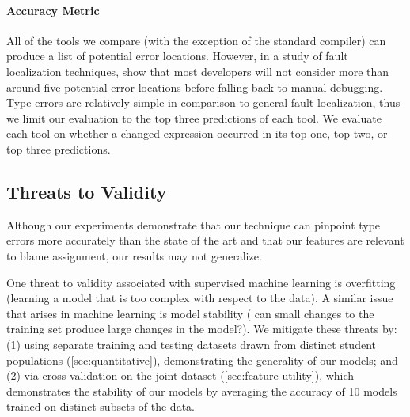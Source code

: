 

\paragraph{Accuracy Metric}
All of the tools we compare (with the exception of the standard \ocaml
compiler) can produce a list of potential error locations. 
%
However, in a study of fault localization techniques,
\citet{Kochhar2016-oc} show that most developers will not consider more
than around five potential error locations before falling back to manual
debugging.
%
Type errors are relatively simple in comparison to general fault
localization, thus we limit our evaluation to the top three predictions
of each tool.
%
We evaluate each tool on whether a changed expression occurred in its
top one, top two, or top three predictions.





\subsection{Threats to Validity} 

Although our experiments demonstrate that our technique can pinpoint type
errors more accurately than the state of the art and that our features are
relevant to blame assignment, our results may not generalize. 

One threat to validity associated with supervised machine learning is
overfitting (\ie learning a model that is too complex with respect to
the data).
%
A similar issue that arises in machine learning is model stability (\ie
can small changes to the training set produce large changes in the model?).
%
We mitigate these threats by:
%
(1) using separate training and testing datasets drawn from distinct
student populations (\autoref{sec:quantitative}), demonstrating the
generality of our models; and
%
(2) via cross-validation on the joint dataset
(\autoref{sec:feature-utility}), which demonstrates the stability of our
models by averaging the accuracy of 10 models trained on distinct
subsets of the data.

